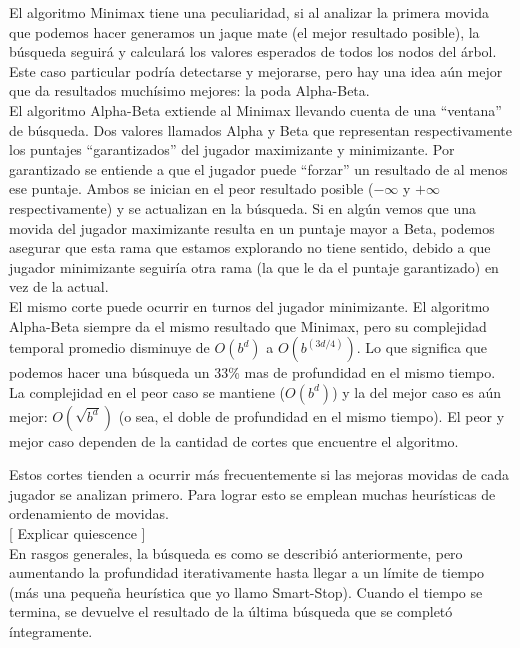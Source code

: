 \documentclass{article}
\begin{document}
El algoritmo Minimax tiene una peculiaridad, si al analizar la primera
movida que podemos hacer generamos un jaque mate (el mejor resultado
posible), la búsqueda seguirá y calculará los valores esperados de
todos los nodos del árbol. Este caso particular podría detectarse y
mejorarse, pero hay una idea aún mejor que da resultados muchísimo
mejores: la poda Alpha-Beta.
\\

El algoritmo Alpha-Beta extiende al Minimax llevando cuenta de una
``ventana'' de búsqueda. Dos valores llamados Alpha y Beta que
representan respectivamente los puntajes ``garantizados'' del jugador
maximizante y minimizante. Por garantizado se entiende a que el jugador
puede ``forzar'' un resultado de al menos ese puntaje. Ambos se inician
en el peor resultado posible ($-\infty$ y $+\infty$ respectivamente)
y se actualizan en la búsqueda. Si en algún vemos que una movida
del jugador maximizante resulta en un puntaje mayor a Beta, podemos
asegurar que esta rama que estamos explorando no tiene sentido, debido
a que jugador minimizante seguiría otra rama (la que le da el puntaje
garantizado) en vez de la actual.
\\

El mismo corte puede ocurrir en turnos del jugador minimizante. El
algoritmo Alpha-Beta siempre da el mismo resultado que Minimax,
pero su complejidad temporal promedio disminuye de $O(b^d)$ a
$O(b^{(3d/4)})$\footnotemark. Lo que significa que podemos hacer una
búsqueda un 33\% mas de profundidad en el mismo tiempo. La complejidad
en el peor caso se mantiene ($O(b^d)$) y la del mejor caso es aún
mejor: $O(\sqrt{b^d})$ (o sea, el doble de profundidad en el mismo
tiempo). El peor y mejor caso dependen de la cantidad de cortes que
encuentre el algoritmo.
\\


Estos cortes tienden a ocurrir más frecuentemente si las mejoras
movidas de cada jugador se analizan primero. Para lograr esto se emplean
muchas heurísticas de ordenamiento de movidas.
\\

[ Explicar quiescence ]
\\

En rasgos generales, la búsqueda es como se describió anteriormente,
pero aumentando la profundidad iterativamente hasta llegar a un límite
de tiempo (más una pequeña heurística que yo llamo Smart-Stop).
Cuando el tiempo se termina, se devuelve el resultado de la última
búsqueda que se completó íntegramente.
\end{document}
